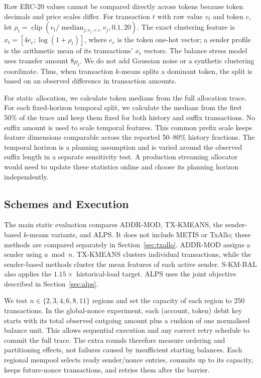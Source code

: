 \documentclass[conference,letterpaper]{IEEEtran}
\begin{document}
Raw ERC-20 values cannot be compared directly across tokens because token
decimals and price scales differ. For transaction $t$ with raw value $v_t$ and
token $c$, let
$\rho_t=\operatorname{clip}(v_t/\operatorname{median}_{j:c_j=c}v_j,0.1,20)$.
The exact clustering feature is
$x_t=[4e_c;\log(1+\rho_t)]$, where $e_c$ is the token one-hot vector; a sender
profile is the arithmetic mean of its transactions' $x_t$ vectors. The balance
stress model uses transfer amount $8\rho_t$. We do not add Gaussian noise or a
synthetic clustering coordinate. Thus, when transaction $k$-means splits a
dominant token, the split is based on an observed difference in transaction
amounts.

For static allocation, we calculate token medians from the full allocation
trace. For each fixed-horizon temporal split, we calculate the medians from
the first 50\% of the trace and keep them fixed for both history and suffix
transactions. No suffix amount is used to scale temporal features. This
common prefix scale keeps feature dimensions comparable across the reported
50--80\% history fractions. The temporal horizon is a planning assumption and
is varied around the observed suffix length in a separate sensitivity test.
A production streaming allocator would need to update these statistics
online and choose its planning horizon independently.

\subsection{Schemes and Execution}

The main static evaluation compares ADDR-MOD, TX-KMEANS, the sender-based
$k$-means variants, and ALPS. It does not include METIS or TxAllo; these methods
are compared separately in Section~\ref{sec:txallo}. ADDR-MOD assigns a sender
using $a\bmod n$. TX-KMEANS clusters individual transactions, while the
sender-based methods cluster the mean features of each active sender.
S-KM-BAL also applies the $1.15\times$ historical-load target. ALPS uses the
joint objective described in Section~\ref{sec:alps}.

We test $n\in\{2,3,4,6,8,11\}$ regions and set the capacity of each region
to 250 transactions. In the global-nonce experiment, each
(account, token) debit key starts with its total observed outgoing amount plus
a cushion of one normalised balance unit. This allows sequential execution and
any correct retry schedule to commit the full trace. The extra rounds therefore
measure ordering and partitioning effects, not failures caused by insufficient
starting balances. Each regional mempool selects ready sender/nonce entries,
commits up to its capacity, keeps future-nonce transactions, and retries them
after the barrier.
\end{document}
